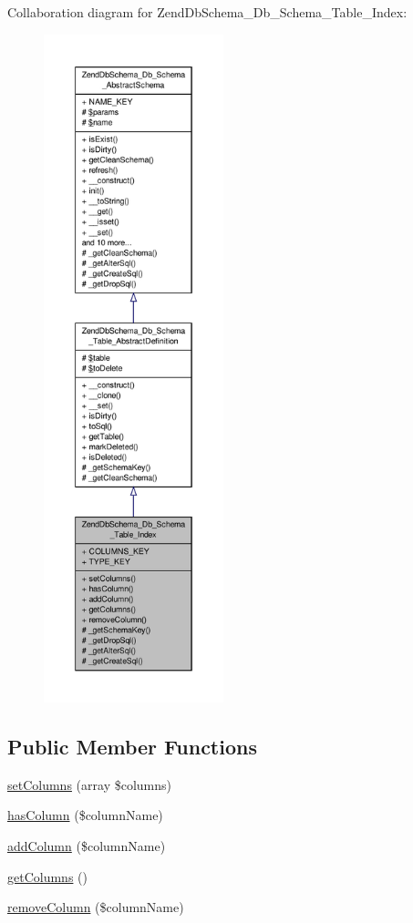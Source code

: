 Collaboration diagram for Zend\-Db\-Schema\-\_\-\-Db\-\_\-\-Schema\-\_\-\-Table\-\_\-\-Index\-:\nopagebreak
\begin{figure}[H]
\begin{center}
\leavevmode
\includegraphics[height=550pt]{classZendDbSchema__Db__Schema__Table__Index__coll__graph}
\end{center}
\end{figure}
\subsection*{Public Member Functions}
\begin{DoxyCompactItemize}
\item 
\hyperlink{classZendDbSchema__Db__Schema__Table__Index_a77b65e961a7da9ca89fdebd682338fcf}{set\-Columns} (array \$columns)
\item 
\hyperlink{classZendDbSchema__Db__Schema__Table__Index_af7c29da0f52c5270ffa3587a95295f82}{has\-Column} (\$column\-Name)
\item 
\hyperlink{classZendDbSchema__Db__Schema__Table__Index_a6717d976c5b0d47369d3c87ef17b1e9b}{add\-Column} (\$column\-Name)
\item 
\hyperlink{classZendDbSchema__Db__Schema__Table__Index_ad0edf2869c08ce408566798f4305b8dc}{get\-Columns} ()
\item 
\hyperlink{classZendDbSchema__Db__Schema__Table__Index_a3cfd358621bb3330ef9e7ffcf2f7b229}{remove\-Column} (\$column\-Name)
\end{DoxyCompactItemize}
